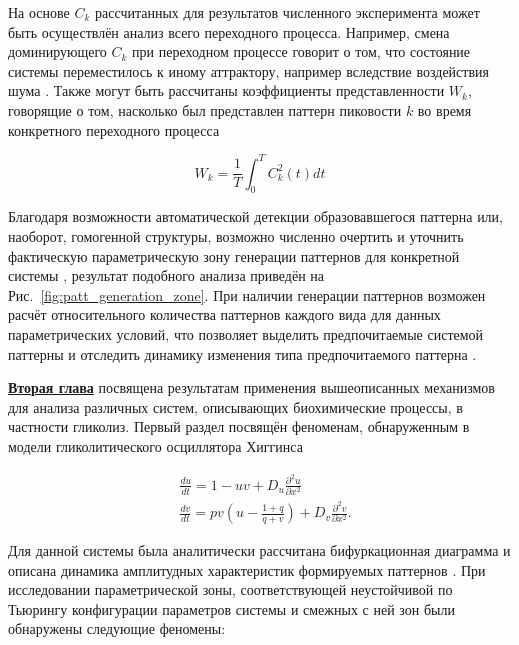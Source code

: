 На основе $C_k$ рассчитанных для результатов численного эксперимента может быть осуществлён анализ всего переходного процесса. Например, смена доминирующего $C_k$ при переходном процессе говорит о том, что состояние системы переместилось к иному аттрактору, например вследствие воздействия шума \cite{bib4}. Также могут быть рассчитаны коэффициенты представленности $W_k$, говорящие о том, насколько был представлен паттерн пиковости $k$ во время конкретного переходного процесса

\begin{equation}
    W_k=\frac{1}{T} \int_0^T C_k^2(t) d t
\end{equation}

Благодаря возможности автоматической детекции образовавшегося паттерна или, наоборот, гомогенной структуры, возможно численно очертить и уточнить фактическую параметрическую зону генерации  паттернов для конкретной системы \cite{bib2}, результат подобного анализа приведён на Рис.~\ref{fig:patt_generation_zone}. При наличии генерации паттернов возможен расчёт относительного количества паттернов каждого вида для данных параметрических условий, что позволяет выделить предпочитаемые системой паттерны и отследить динамику изменения типа предпочитаемого паттерна \cite{bib4}.

\begin{figure}[ht]
\end{figure}

\underline{\textbf{Вторая глава}} посвящена результатам применения вышеописанных механизмов для анализа различных систем, описывающих биохимические процессы, в частности гликолиз. Первый раздел посвящён феноменам, обнаруженным в модели гликолитического осциллятора Хиггинса \cite{higgins1964chemical}

\begin{equation}
    \begin{aligned}
        & \frac{d u}{d t}=1-u v+D_u \frac{\partial^2 u}{\partial x^2} \\
        & \frac{d v}{d t}=p v\left(u-\frac{1+q}{q+v}\right)+D_v \frac{\partial^2 v}{\partial x^2} .
        \end{aligned}
\end{equation}

Для данной системы была аналитически рассчитана бифуркационная диаграмма и описана динамика амплитудных характеристик формируемых паттернов \cite{bib1}. При исследовании параметрической зоны, соответствующей неустойчивой по Тьюрингу конфигурации параметров системы и смежных с ней зон были обнаружены следующие феномены:

